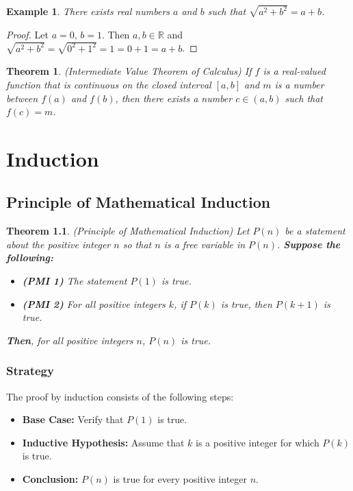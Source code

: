 \documentclass[10pt,reqno]{book}
\theoremstyle{plain}
\newtheorem{theorem}{Theorem}[section]
\newtheorem{example}{Example}
\def\R{\mathbb{R}}
\begin{document}
	\begin{example}
		There exists real numbers $ a $ and $ b $ such that $ \sqrt{a^2 + b^2} = a+b $.
	\end{example}
	\begin{proof}
		Let $ a = 0, \, b = 1 $. Then $ a,b \in \R $ and $ \sqrt{a^2 + b^2} = \sqrt{0^2 + 1^2} = 1 = 0 + 1 = a + b $.
	\end{proof}
	
	\begin{theorem}\emph{(Intermediate Value Theorem of Calculus)}
		If $ f $ is a real-valued function that is continuous on the closed interval $ [a,b] $ and $ m $ is a number between $ f(a) $ and $ f(b) $, then there exists a number $ c \in (a,b) $ such that $ f(c) = m $.
	\end{theorem}
	
	
	\chapter{Induction}
	
	\section{Principle of Mathematical Induction}
	
	\begin{theorem}\emph{(Principle of Mathematical Induction)}
		Let $ P(n) $ be a statement about the positive integer $ n $ so that $ n $ is a free variable in $ P(n) $. \textbf{Suppose the following:}
			\begin{itemize}
				\item \textbf{(PMI 1)} The statement $ P(1) $ is true.
				\item \textbf{(PMI 2)} For all positive integers $ k $, if $ P(k) $ is true, then $ P(k+1) $ is true.
			\end{itemize}
		\textbf{Then}, for all positive integers $ n $, $ P(n) $ is true.
	\end{theorem}
	
	\subsection*{Strategy}
	
	The proof by induction consists of the following steps:
	\begin{itemize}
		\item \textbf{Base Case:} Verify that $ P(1) $ is true.
		\item \textbf{Inductive Hypothesis:} Assume that $ k $ is a positive integer for which $ P(k) $ is true.
		\item \textbf{Conclusion:} $ P(n) $ is true for every positive integer $ n $.
	\end{itemize}
	
\end{document}
